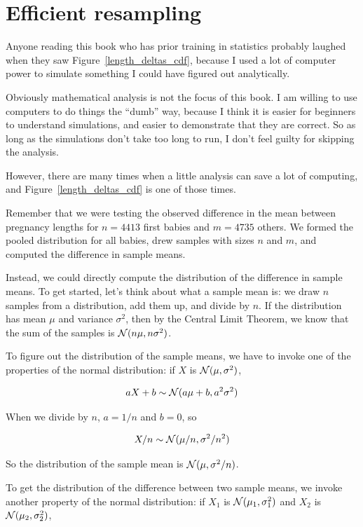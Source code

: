 \documentclass[12pt]{book}
\begin{document}
\section{Efficient resampling}

Anyone reading this book who has prior training in statistics probably
laughed when they saw Figure~\ref{length_deltas_cdf}, because I used a
lot of computer power to simulate something I could have figured out
analytically.

Obviously mathematical analysis is not the focus of this book.  I am
willing to use computers to do things the ``dumb'' way, because I
think it is easier for beginners to understand simulations, and easier
to demonstrate that they are correct.  So as long as the simulations
don't take too long to run, I don't feel guilty for skipping the
analysis.

However, there are many times when a little analysis can save a lot of
computing, and Figure~\ref{length_deltas_cdf} is one of those times.

Remember that we were testing the observed difference in the mean between
pregnancy lengths for $n=4413$ first babies and $m=4735$ others.  We formed
the pooled distribution for all babies, drew samples with sizes $n$ and
$m$, and computed the difference in sample means.

Instead, we could directly compute the distribution of the difference
in sample means.  To get started, let's think about what a sample mean
is: we draw $n$ samples from a distribution, add them up, and
divide by $n$.  If the distribution has mean $\mu$ and variance
$\sigma^2$, then by the Central Limit Theorem, we know that the sum of
the samples is $\mathcal{N} (n \mu, n \sigma^2)$.

To figure out the distribution of the sample means, we have to invoke
one of the properties of the normal distribution: if $X$ is
$\mathcal{N} (\mu, \sigma^2)$,

\[ aX + b \sim \mathcal{N} (a \mu + b, a^2 \sigma^2) \]

When we divide by $n$, $a=1/n$ and $b=0$, so

\[ X/n \sim \mathcal{N} (\mu / n, \sigma^2/ n^2) \]

So the distribution of the sample mean is $\mathcal{N} (\mu, \sigma^2/n)$.

To get the distribution of the difference between two sample means,
we invoke another property of the normal distribution: if $X_1$ is
$\mathcal{N} (\mu_1, \sigma_1^2)$ and $X_2$ is
$\mathcal{N} (\mu_2, \sigma_2^2)$,
\end{document}
